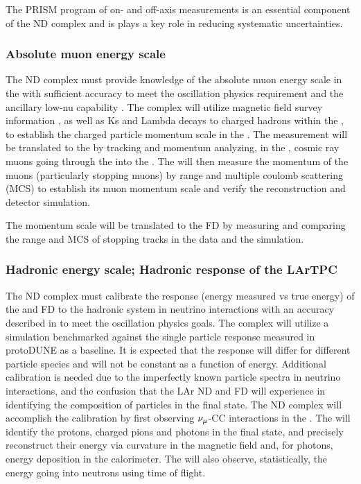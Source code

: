 The PRISM program of on- and off-axis measurements is an essential component of the ND complex and is plays a key role in reducing systematic uncertainties.


\subsubsection{Absolute muon energy scale}

The ND complex must provide knowledge of the absolute muon energy scale in the \larnd with sufficient accuracy to meet the oscillation physics requirement  and the ancillary low-nu capability . The complex will utilize  magnetic field survey information , as well as Ks and Lambda decays to charged hadrons  within the , to establish the charged particle momentum scale in the . 
The measurement will be translated to the \larnd by tracking and momentum analyzing, in the , cosmic ray muons going through the  into the \larnd {}. The \larnd will then measure the momentum of the muons (particularly stopping muons) by range and multiple coulomb scattering (MCS) to establish its muon momentum scale and verify the reconstruction and detector simulation. 

The momentum scale will be translated to the FD by measuring and comparing the range and MCS of stopping tracks in the data and the simulation.


\subsubsection{Hadronic energy scale; Hadronic response of the LArTPC}
The ND complex must calibrate the response (energy measured vs true energy) of the \larnd and FD to the hadronic system in neutrino interactions with an accuracy described in  to meet the oscillation physics goals. The complex will utilize a simulation benchmarked against the single particle response measured in protoDUNE as a baseline. It is expected that the response will differ for different particle species and will not be constant as a function of energy. Additional calibration is needed due to the imperfectly known particle spectra in neutrino interactions, and the confusion that the LAr ND and FD will experience in identifying the composition of particles in the final state. The ND complex will accomplish the calibration by first observing $\nu_\mu$-CC interactions in the . The  will identify the protons, charged pions and photons in the final state, and precisely reconstruct their energy via curvature in the magnetic field and, for photons, energy deposition in the calorimeter. The  will also observe, statistically, the energy going into neutrons using time of flight.

